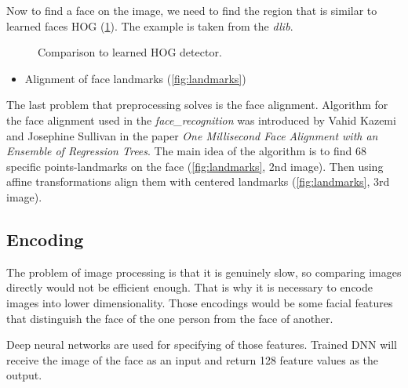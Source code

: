 \documentclass[hidelinks, english]{mvi-report}
\newcommand{\subimage}[3][1]{
\subfigure{
    \texttt{[image: \#2.\#3]}
}
}
\begin{document}
\begin{figure*}[t]
    \centering
    \subimage[0.17]{tilted}{jpg}
    \subimage[0.03]{arrow}{png}
    \subimage[0.17]{landmarks_tilted}{jpg}
    \subimage[0.03]{multiply}{jpg}
    \subimage[0.17]{landmarks}{jpg}
    \subimage[0.03]{arrow}{png}
    \subimage[0.17]{landmarks_aligned}{jpg}
    \caption{Aligned face landmarks.}
    \label{fig:landmarks}
\end{figure*}


Now to find a face on the image, we need to find the region that is similar to learned faces HOG (\cref{fig:detected}).
The example is taken from the \textit{dlib}\cite{generic-hog}.

\begin{figure}[H]
    \centering
    \subimage[0.17]{detected}{jpg}
    \subimage[0.17]{hog_general}{png}
    \caption{Comparison to learned HOG detector.}
    \label{fig:detected}
\end{figure}



\begin{itemize}
\item Alignment of face landmarks (\cref{fig:landmarks})
\end{itemize}

The last problem that preprocessing solves is the face alignment. Algorithm for the face alignment used
in the \textit{face\_recognition} was introduced by Vahid Kazemi and Josephine Sullivan in the paper
\textit{One Millisecond Face Alignment with an Ensemble of Regression Trees}\cite{face-alignment}. The main idea of the
algorithm is to find 68 specific points-landmarks on the face (\cref{fig:landmarks}, 2nd image). Then using affine
transformations align them with centered landmarks (\cref{fig:landmarks}, 3rd image).


\subsection{Encoding}

The problem of image processing is that it is genuinely slow, so comparing images directly would not be efficient
enough. That is why it is necessary to encode images into lower dimensionality. Those encodings would be some facial
features that distinguish the face of the one person from the face of another.

Deep neural networks are used for specifying of those features. Trained DNN will receive the image of the face as
an input and return 128 feature values as the output.
\end{document}
